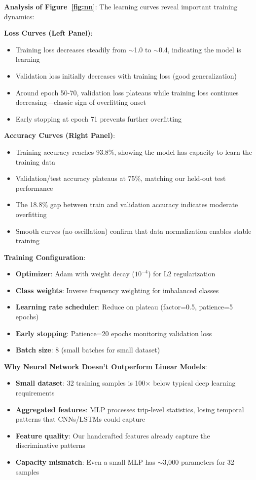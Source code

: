 \documentclass[11pt,a4paper]{article}
\begin{document}
\textbf{Analysis of Figure~\ref{fig:nn}}: The learning curves reveal important training dynamics:

\textbf{Loss Curves (Left Panel)}:
\begin{itemize}[leftmargin=*]
    \item Training loss decreases steadily from $\sim$1.0 to $\sim$0.4, indicating the model is learning
    \item Validation loss initially decreases with training loss (good generalization)
    \item Around epoch 50-70, validation loss plateaus while training loss continues decreasing---classic sign of overfitting onset
    \item Early stopping at epoch 71 prevents further overfitting
\end{itemize}

\textbf{Accuracy Curves (Right Panel)}:
\begin{itemize}[leftmargin=*]
    \item Training accuracy reaches 93.8\%, showing the model has capacity to learn the training data
    \item Validation/test accuracy plateaus at 75\%, matching our held-out test performance
    \item The 18.8\% gap between train and validation accuracy indicates moderate overfitting
    \item Smooth curves (no oscillation) confirm that data normalization enables stable training
\end{itemize}

\textbf{Training Configuration}:
\begin{itemize}[leftmargin=*]
    \item \textbf{Optimizer}: Adam with weight decay ($10^{-4}$) for L2 regularization
    \item \textbf{Class weights}: Inverse frequency weighting for imbalanced classes
    \item \textbf{Learning rate scheduler}: Reduce on plateau (factor=0.5, patience=5 epochs)
    \item \textbf{Early stopping}: Patience=20 epochs monitoring validation loss
    \item \textbf{Batch size}: 8 (small batches for small dataset)
\end{itemize}

\textbf{Why Neural Network Doesn't Outperform Linear Models}:
\begin{itemize}[leftmargin=*]
    \item \textbf{Small dataset}: 32 training samples is 100$\times$ below typical deep learning requirements
    \item \textbf{Aggregated features}: MLP processes trip-level statistics, losing temporal patterns that CNNs/LSTMs could capture
    \item \textbf{Feature quality}: Our handcrafted features already capture the discriminative patterns
    \item \textbf{Capacity mismatch}: Even a small MLP has $\sim$3,000 parameters for 32 samples
\end{itemize}
\end{document}
